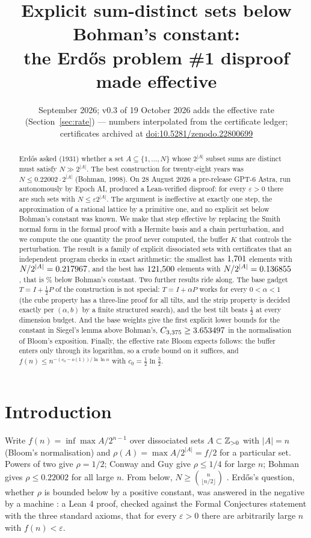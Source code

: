 \documentclass[11pt]{article}
\title{Explicit sum-distinct sets below Bohman's constant:\\
the Erd\H{o}s problem \#1 disproof made effective}
\author{\cmauthor}
\date{September 2026; v0.3 of 19 October 2026 adds the effective rate (Section~\ref{sec:rate}) --- numbers interpolated from the certificate ledger; certificates archived at \href{https://doi.org/10.5281/zenodo.22800699}{doi:10.5281/zenodo.22800699}}
\begin{document}
\maketitle

\begin{abstract}
Erd\H{o}s asked (1931) whether a set $A\subseteq\{1,\dots,N\}$ whose $2^{|A|}$ subset sums are
distinct must satisfy $N\gg 2^{|A|}$. The best construction for twenty-eight years was
$N\le 0.22002\cdot 2^{|A|}$ (Bohman, 1998). On 28 August 2026 a pre-release GPT-6 Astra,
run autonomously by Epoch AI, produced a Lean-verified disproof: for every
$\varepsilon>0$ there are such sets with $N\le\varepsilon 2^{|A|}$. The argument is
ineffective at exactly one step, the approximation of a rational lattice by a primitive
one, and no explicit set below Bohman's constant was known. We make that step effective
by replacing the Smith normal form in the formal proof with a Hermite basis and a chain
perturbation, and we compute the one quantity the proof never computed, the buffer
$K$ that controls the perturbation. The result is a family of explicit dissociated sets
with certificates that an independent program checks in exact arithmetic: the smallest
has $1{,}701$ elements with $N/2^{|A|}=0.217967$, and the best has $121{,}500$ elements
with $N/2^{|A|}=0.136855$, that is \Gain\% below Bohman's constant. Two further results
ride along. The base gadget $T=I+\tfrac12P$ of the construction is not special: $T=I+\alpha P$
works for every $0<\alpha<1$ (the cube property has a three-line proof for all tilts, and the
strip property is decided exactly per $(\alpha,b)$ by a finite structured search), and the
best tilt beats $\tfrac12$ at every dimension budget. And the base weights give the first
explicit lower bounds for the constant in Siegel's lemma above Bohman's,
$C_{3{,}375}\ge3.653497$ in the normalisation of Bloom's exposition. Finally, the effective rate Bloom expects follows: the buffer enters only through its logarithm, so a crude bound on it suffices, and $f(n)\le n^{-(c_0-o(1))/\ln\ln n}$ with $c_0=\frac12\ln\frac32$.
\end{abstract}

\section{Introduction}

Write $f(n)=\inf\max A/2^{n-1}$ over dissociated sets $A\subset\mathbb{Z}_{>0}$ with $|A|=n$
(Bloom's normalisation) and $\rho(A)=\max A/2^{|A|}=f/2$ for a particular set. Powers of two
give $\rho=1/2$; Conway and Guy give $\rho\le 1/4$ for large $n$; Bohman \cite{Bo98}
gives $\rho\le 0.22002$ for all large $n$. From below, $N\ge\binom{n}{\lfloor n/2\rfloor}$
\cite{DFX21}. Erd\H{o}s's question, whether $\rho$ is bounded below by a positive constant,
was answered in the negative by a machine \cite{Epoch26,Erdos1repo}: a Lean 4 proof, checked
against the Formal Conjectures statement with the three standard axioms,
that for every $\varepsilon>0$ there are arbitrarily large $n$ with $f(n)<\varepsilon$.
\end{document}
